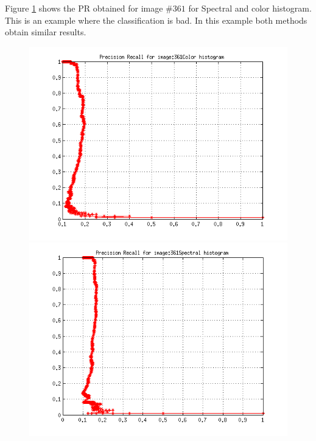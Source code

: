 \documentclass[a4paper,12pt]{article}
\begin{document}
Figure \ref{fig:bad} shows the PR obtained for image $\#361$ for Spectral and color histogram. This
is an example where the classification is bad. In this example both methods obtain similar
results. 
\begin{figure}[h!]
    \centering
    \includegraphics[totalheight=.24\textheight]{../Results/PR/BadColor.png}
    \includegraphics[totalheight=.24\textheight]{../Results/PR/BadSpectral.png}
    \label{fig:bad}
\end{figure}
\end{document}
